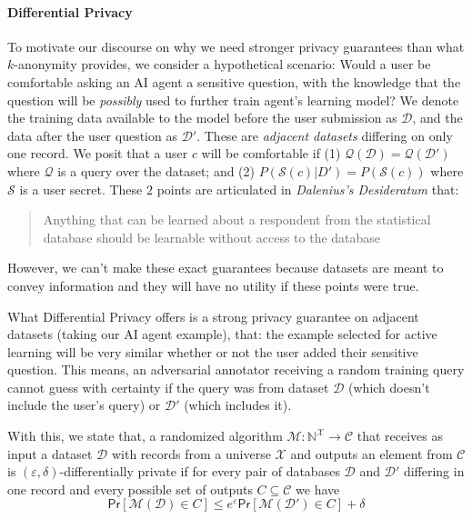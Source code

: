 \documentclass[letterpaper]{article}
\begin{document}
\paragraph{Differential Privacy}

To motivate our discourse on why we need stronger privacy guarantees than what $k$-anonymity provides, we consider a hypothetical scenario: Would a user be comfortable asking an AI agent a sensitive question, with the knowledge that the question will be \textit{possibly} used to further train agent's learning model? We denote the training data available to the model before the user submission as $\mathcal{D}$, and the data after the user question as $\mathcal{D}'$. These are \textit{adjacent datasets} differing on only one record. We posit that a user $c$ will be comfortable if (1) $\mathcal{Q(D)} = \mathcal{Q(D')}$ where $\mathcal{Q}$ is a query over the dataset; and (2) $P(\mathcal{S}(c)|D') = P(\mathcal{S}(c))$ where $\mathcal{S}$ is a user secret. These $2$ points are articulated in \textit{Dalenius's Desideratum} \cite{dwork2011firm} that: \begin{quote} Anything that can be learned about a respondent from the statistical database should be learnable without access to the database \end{quote}

\noindent However, we can't make these exact guarantees because datasets are meant to convey information and they will have no utility if these points were true.

What Differential Privacy \cite{dwork2011firm,dwork2014algorithmic} offers is a strong privacy guarantee on adjacent datasets (taking our AI agent example), that: the example selected for active learning will be very similar whether or not the user added their sensitive question. This means, an adversarial annotator receiving a random training query cannot guess with certainty if the query was from dataset $\mathcal{D}$ (which doesn't include the user's query) or $\mathcal{D}'$ (which includes it).


With this, we state that, a randomized algorithm $\mathcal{M} : \mathbb{N}^{\mathcal{X}} \to \mathcal{C}$ that receives as input a dataset $\mathcal{D}$ with records from a universe $\mathcal{X}$ and outputs an element from $\mathcal{C}$ is $(\varepsilon,\delta)$-differentially private if for every pair of databases $\mathcal{D}$ and $\mathcal{D'}$ differing in one record and every possible set of outputs $C \subseteq \mathcal{C}$ we have
\begin{equation}
\mathsf{Pr}[\mathcal{M}(\mathcal{D}) \in C] \leq e^\varepsilon \mathsf{Pr}[\mathcal{M}(\mathcal{D'}) \in C] + \delta
\end{equation}
\end{document}
